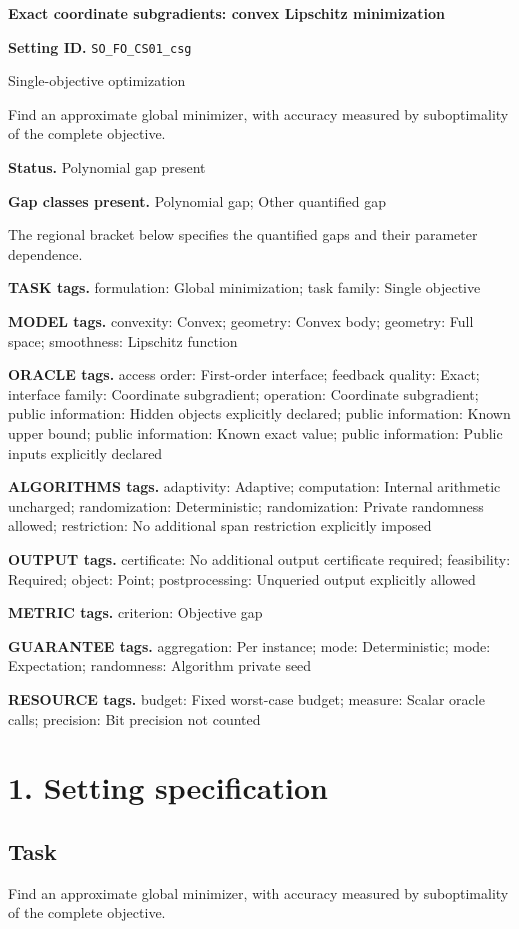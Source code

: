 \documentclass[10pt,a4paper]{article}
\begin{document}
\raggedright

{\LARGE\bfseries\sffamily\color{AtlasNavy} Exact coordinate subgradients: convex Lipschitz minimization\par}\vspace{5pt}
\textbf{Setting ID.} \texttt{SO\_\allowbreak{}FO\_\allowbreak{}CS01\_\allowbreak{}csg}

Single-objective optimization

Find an approximate global minimizer, with accuracy measured by suboptimality of the complete objective.

\textbf{Status.} Polynomial gap present

\textbf{Gap classes present.} Polynomial gap; Other quantified gap

The regional bracket below specifies the quantified gaps and their parameter dependence.

\textbf{TASK tags.} formulation: Global minimization; task family: Single objective

\textbf{MODEL tags.} convexity: Convex; geometry: Convex body; geometry: Full space; smoothness: Lipschitz function

\textbf{ORACLE tags.} access order: First-order interface; feedback quality: Exact; interface family: Coordinate subgradient; operation: Coordinate subgradient; public information: Hidden objects explicitly declared; public information: Known upper bound; public information: Known exact value; public information: Public inputs explicitly declared

\textbf{ALGORITHMS tags.} adaptivity: Adaptive; computation: Internal arithmetic uncharged; randomization: Deterministic; randomization: Private randomness allowed; restriction: No additional span restriction explicitly imposed

\textbf{OUTPUT tags.} certificate: No additional output certificate required; feasibility: Required; object: Point; postprocessing: Unqueried output explicitly allowed

\textbf{METRIC tags.} criterion: Objective gap

\textbf{GUARANTEE tags.} aggregation: Per instance; mode: Deterministic; mode: Expectation; randomness: Algorithm private seed

\textbf{RESOURCE tags.} budget: Fixed worst-case budget; measure: Scalar oracle calls; precision: Bit precision not counted

\section{1. Setting specification}
\subsection{Task}
Find an approximate global minimizer, with accuracy measured by suboptimality of the complete objective.
\end{document}
